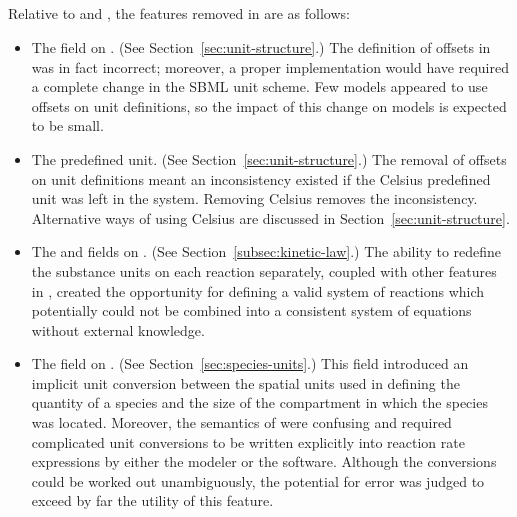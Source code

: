 
\begin{blockChanged}
\renewcommand{\thesection}{\changed{\Alph{section}}}

\section{}
\label{apdx:changes}

\renewcommand{\thesection}{\Alph{section}}


Relative to \sbmltwoone and \sbmltwotwo, the features removed in
\thisLV are as follows:
\begin{itemize}
  
\item The  field on \UnitDefinition.  (See
  Section~\ref{sec:unit-structure}.)  The definition of offsets in
  \sbmltwoone was in fact incorrect; moreover, a proper
  implementation would have required a complete change in the SBML
  unit scheme.  Few models appeared to use offsets on unit
  definitions, so the impact of this change on models is expected
  to be small.
  
\item The  predefined unit.  (See
  Section~\ref{sec:unit-structure}.)  The removal of offsets on
  unit definitions meant an inconsistency existed if the Celsius
  predefined unit was left in the system.  Removing Celsius
  removes the inconsistency.  Alternative ways of using Celsius
  are discussed in Section~\ref{sec:unit-structure}.
  
\item The  and  fields on
  \KineticLaw.  (See Section~\ref{subsec:kinetic-law}.)  The
  ability to redefine the substance units on each reaction
  separately, coupled with other features in \sbmltwoone, created
  the opportunity for defining a valid system of reactions which
  potentially could not be combined into a consistent system of
  equations without external knowledge.

\item The  field on \Species.  (See
  Section~\ref{sec:species-units}.)  This field introduced an
  implicit unit conversion between the spatial units used in
  defining the quantity of a species and the size of the
  compartment in which the species was located.  Moreover, the
  semantics of  were confusing and
  required complicated unit conversions to be written explicitly
  into reaction rate expressions by either the modeler or the
  software.  Although the conversions could be worked out
  unambiguously, the potential for error was judged to exceed by
  far the utility of this feature.


\end{itemize}
\end{blockChanged}
